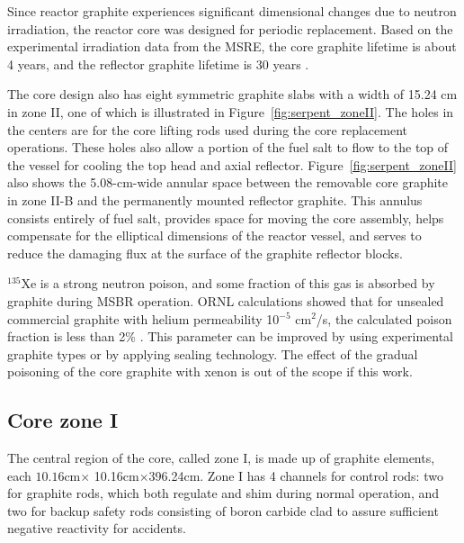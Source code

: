 Since reactor graphite experiences significant dimensional changes due to 
neutron irradiation, the reactor core was designed for periodic replacement. 
Based on the experimental irradiation data from the \gls{MSRE}, the core 
graphite lifetime is about 4 years, and the reflector graphite lifetime is 30 
years \cite{robertson_conceptual_1971}.

The core design also has eight symmetric graphite slabs with a width of 15.24 
cm in zone II, one of which is illustrated in Figure~\ref{fig:serpent_zoneII}. 
The holes in the centers are for the core lifting rods used during the core 
replacement operations. These holes also allow a portion of the fuel salt to 
flow to the top of the vessel for cooling the top head and axial reflector.  
Figure~\ref{fig:serpent_zoneII} also shows the 5.08-cm-wide annular 
space between the removable core graphite in zone II-B and the permanently 
mounted reflector graphite. This annulus consists entirely of fuel salt, 
provides space for moving the core assembly, helps compensate for the 
elliptical dimensions of the reactor vessel, and serves to reduce the damaging 
flux at the surface of the graphite reflector blocks. 

$^{135}$Xe is a strong neutron poison, and some fraction of this gas is 
absorbed by graphite during \gls{MSBR} operation. ORNL calculations showed 
that for unsealed commercial graphite with helium permeability 10$^{-5}$ 
cm$^2$/s, the calculated poison fraction is less than 2\% 
\cite{robertson_conceptual_1971}. This parameter can be improved by using 
experimental graphite types or by applying sealing technology. The effect of 
the gradual poisoning of the core graphite with xenon is out of the scope if 
this work.

\subsection{Core zone I}
The central region of the core, called zone I, is made up of graphite 
elements, each $10.16$cm$\times$ 10.16cm$\times$396.24cm. Zone I has 4 
channels for control rods: two for graphite rods, which both regulate and shim 
during normal operation, and two for backup safety rods consisting of boron 
carbide clad to assure sufficient negative reactivity for accidents.

